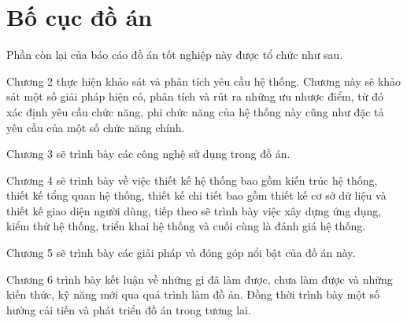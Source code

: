 \documentclass[../DoAn.tex]{subfiles}
\begin{document}
\section{Bố cục đồ án}
\label{section:1.4}
Phần còn lại của báo cáo đồ án tốt nghiệp này được tổ chức như sau. 

Chương 2 thực hiện khảo sát và phân tích yêu cầu hệ thống. Chương này sẽ khảo sát một số giải pháp hiện có, phân tích và rút ra những ưu nhược điểm, từ đó xác định yêu cầu chức năng, phi chức năng của hệ thống này cũng như đặc tả yêu cầu của một số chức năng chính.

Chương 3 sẽ trình bày các công nghệ sử dụng trong đồ án.

Chương 4 sẽ trình bày về việc thiết kế hệ thống bao gồm kiến trúc hệ thống, thiết kế tổng quan hệ thống, thiết kế chi tiết bao gồm thiết kế cơ sở dữ liệu và thiết kế giao diện người dùng, tiếp theo sẽ trình bày việc xây dựng ứng dụng, kiểm thử hệ thống, triển khai hệ thống và cuối cùng là đánh giá hệ thống.

Chương 5 sẽ trình bày các giải pháp và đóng góp nổi bật của đồ án này.

Chương 6 trình bày kết luận về những gì đã làm được, chưa làm được và những kiến thức, kỹ năng mới qua quá trình làm đồ án. Đồng thời trình bày một số hướng cải tiến và phát triển đồ án trong tương lai.
\end{document}
